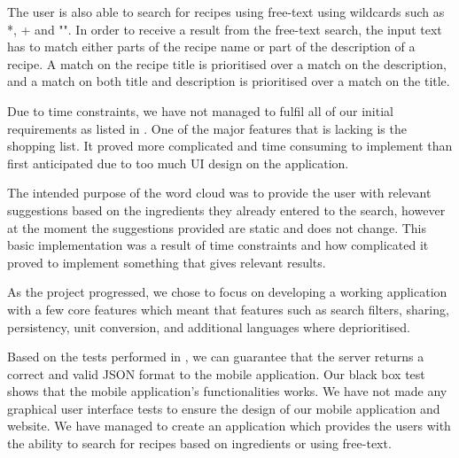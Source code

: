 The user is also able to search for recipes using free-text using wildcards such as *, + and "". In order to receive a result from the free-text search, the input text has to match either parts of the recipe name or part of the description of a recipe. A match on the recipe title is prioritised over a match on the description, and a match on both title and description is prioritised over a match on the title.

Due to time constraints, we have not managed to fulfil all of our initial requirements as listed in . One of the major features that is lacking is the shopping list. It proved more complicated and time consuming to implement than first anticipated due to too much UI design on the application.

The intended purpose of the word cloud was to provide the user with relevant suggestions based on the ingredients they already entered to the search, however at the moment the suggestions provided are static and does not change. This basic implementation was a result of time constraints and how complicated it proved to implement something that gives relevant results. 

As the project progressed, we chose to focus on developing a working application with a few core features which meant that features such as search filters, sharing, persistency, unit conversion, and additional languages where deprioritised. 

Based on the tests performed in , we can guarantee that the server returns a correct and valid JSON format to the mobile application. Our black box test shows that the mobile application's functionalities works. We have not made any graphical user interface tests to ensure the design of our mobile application and website. We have managed to create an application which provides the users with the ability to search for recipes based on ingredients or using free-text.